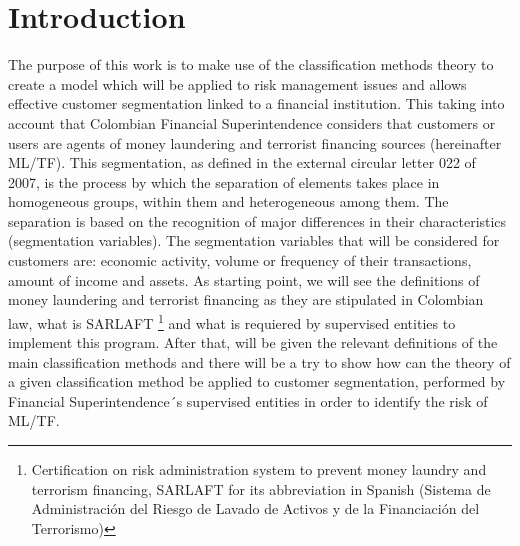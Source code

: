 \chapter{Introduction}
\label{chap:Introduction}
The purpose of this work is to make use of the classification methods theory to create a model which will be applied to risk management issues and allows effective customer segmentation linked to a financial institution. This taking into account that Colombian Financial Superintendence considers that customers or users are agents of money laundering and terrorist financing sources (hereinafter ML/TF). This segmentation, as defined in the external circular letter 022 of 2007, is the process by which the separation of elements takes place in homogeneous groups, within them and heterogeneous among them.
The separation is based on the recognition of major differences in their characteristics (segmentation variables). The segmentation variables that will be considered for customers are: economic activity, volume or frequency of their transactions, amount of income and assets.
As starting point, we will see the definitions of money laundering and terrorist financing as they are stipulated in Colombian law, what is SARLAFT \footnote{Certification on risk administration system to prevent money laundry and terrorism financing, SARLAFT  for  its abbreviation in Spanish (Sistema de Administración del Riesgo de Lavado de Activos y de la Financiación del Terrorismo)}   and what is requiered by supervised entities to implement this program. After that, will be given the relevant definitions of the main classification methods and there will be a try to show how can the theory of a given classification method be applied to customer segmentation, performed by Financial Superintendence´s supervised entities in order to identify the risk of ML/TF.
\clearemptydoublepage
